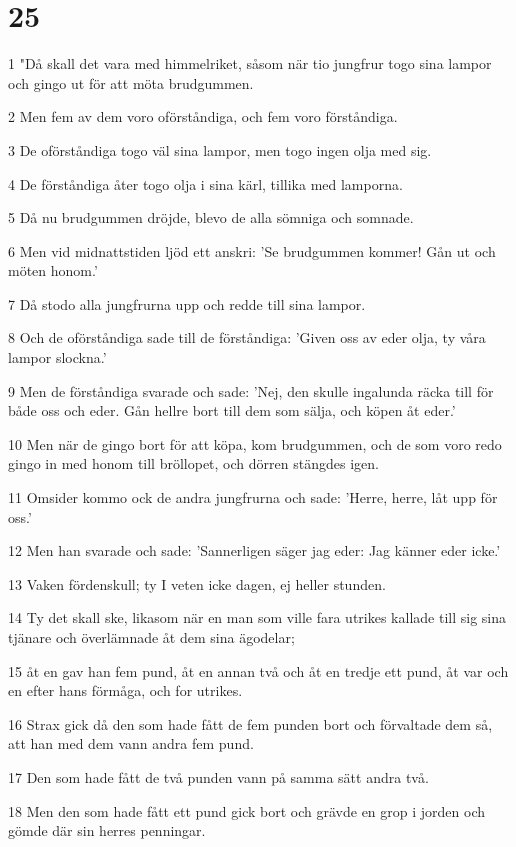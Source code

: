 \chapter{25}

\par 1 "Då skall det vara med himmelriket, såsom när tio jungfrur togo sina lampor och gingo ut för att möta brudgummen.
\par 2 Men fem av dem voro oförståndiga, och fem voro förståndiga.
\par 3 De oförståndiga togo väl sina lampor, men togo ingen olja med sig.
\par 4 De förståndiga åter togo olja i sina kärl, tillika med lamporna.
\par 5 Då nu brudgummen dröjde, blevo de alla sömniga och somnade.
\par 6 Men vid midnattstiden ljöd ett anskri: 'Se brudgummen kommer! Gån ut och möten honom.'
\par 7 Då stodo alla jungfrurna upp och redde till sina lampor.
\par 8 Och de oförståndiga sade till de förståndiga: 'Given oss av eder olja, ty våra lampor slockna.'
\par 9 Men de förståndiga svarade och sade: 'Nej, den skulle ingalunda räcka till för både oss och eder. Gån hellre bort till dem som sälja, och köpen åt eder.'
\par 10 Men när de gingo bort för att köpa, kom brudgummen, och de som voro redo gingo in med honom till bröllopet, och dörren stängdes igen.
\par 11 Omsider kommo ock de andra jungfrurna och sade: 'Herre, herre, låt upp för oss.'
\par 12 Men han svarade och sade: 'Sannerligen säger jag eder: Jag känner eder icke.'
\par 13 Vaken fördenskull; ty I veten icke dagen, ej heller stunden.
\par 14 Ty det skall ske, likasom när en man som ville fara utrikes kallade till sig sina tjänare och överlämnade åt dem sina ägodelar;
\par 15 åt en gav han fem pund, åt en annan två och åt en tredje ett pund, åt var och en efter hans förmåga, och for utrikes.
\par 16 Strax gick då den som hade fått de fem punden bort och förvaltade dem så, att han med dem vann andra fem pund.
\par 17 Den som hade fått de två punden vann på samma sätt andra två.
\par 18 Men den som hade fått ett pund gick bort och grävde en grop i jorden och gömde där sin herres penningar.
